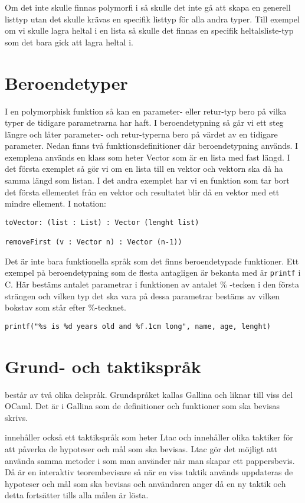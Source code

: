 Om det inte skulle finnas polymorfi i \coq så skulle det inte gå att skapa en
generell listtyp utan det skulle krävas en specifik listtyp för alla andra
typer. Till exempel om vi skulle lagra heltal i en lista så skulle det finnas
en specifik heltalsliste-typ som det bara gick att lagra heltal i.

\section{Beroendetyper}
I en polymorphisk funktion så kan en parameter- eller retur-typ bero på vilka
typer de tidigare parametrarna har haft. I beroendetypning så går vi ett steg
längre och låter parameter- och retur-typerna bero på värdet av en
tidigare parameter.
Nedan finns två funktionsdefinitioner där beroendetypning används.
I exemplena används en klass som heter Vector som är en lista med fast längd. I
det första exemplet så gör vi om en lista till en vektor och vektorn ska då ha
samma längd som listan. I det andra exemplet har vi en funktion som tar bort
det första ellementet från en vektor och resultatet blir då en vektor med ett
mindre ellement. I \coq notation:
\begin{verbatim}
toVector: (list : List) : Vector (lenght list)

removeFirst (v : Vector n) : Vector (n-1))
\end{verbatim}

Det är inte bara funktionella språk som det finns beroendetypade funktioner.
Ett exempel på beroendetypning som de flesta antagligen är bekanta med är
\texttt{printf} i C. Här bestäms antalet parametrar i funktionen av antalet
\% -tecken i den första strängen och vilken typ det ska vara på dessa
parametrar bestäms av vilken bokstav som står efter \%-tecknet.
\begin{verbatim}
printf("%s is %d years old and %f.1cm long", name, age, lenght)
\end{verbatim}


\section{Grund- och taktikspråk}
\coq består av två olika delspråk. Grundspråket kallas Gallina och liknar till
viss del OCaml. Det är i Gallina som de definitioner och funktioner som ska
bevisas skrivs.

\coq innehåller också ett taktikspråk som heter Ltac och innehåller olika
taktiker för att påverka de hypoteser och mål som ska bevisas. Ltac gör det
möjligt att använda samma metoder i \coq som man använder när man skapar ett
pappersbevis. Då \coq är en interaktiv teorembevisare så när en viss taktik
används uppdateras de hypoteser och mål som ska bevisas och användaren
anger då en ny taktik och detta fortsätter tills alla målen är lösta.

